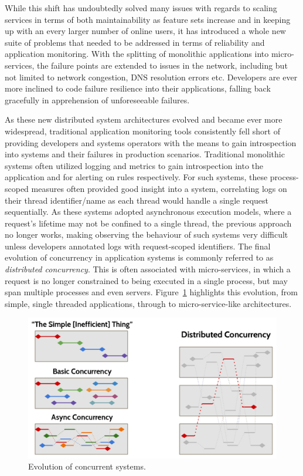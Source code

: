 \documentclass[12pt,pdftex,titlepage]{report}
\begin{document}
            While this shift has undoubtedly solved many issues with regards to scaling services in terms of both maintainability as feature sets increase and in keeping up
            with an every larger number of online users, it has introduced a whole new suite of problems that needed to be addressed in terms of reliability and application 
            monitoring. With the splitting of monolithic applications into micro-services, the failure points are extended to issues in the network, including but not limited
            to network congestion, DNS resolution errors etc. Developers are ever more inclined to code failure resilience into their applications, falling back gracefully in 
            apprehension of unforeseeable failures.

            As these new distributed system architectures evolved and became ever more widespread, traditional application monitoring tools consistently fell short of providing
            developers and systems operators with the means to gain introspection into systems and their failures in production scenarios. Traditional monolithic systems often
            utilized logging and metrics to gain introspection into the application and for alerting on rules respectively. For such systems, these process-scoped measures often 
            provided good insight into a system, correlating logs on their thread identifier/name as each thread would handle a single request sequentially. As these systems 
            adopted asynchronous execution models, where a request's lifetime may not be confined to a single thread, the previous approach no longer works, making observing
            the behaviour of such systems very difficult unless developers annotated logs with request-scoped identifiers. The final evolution of concurrency in application systems is
            commonly referred to as \textit{distributed concurrency}. This is often associated with micro-services, in which a request is no longer constrained to being executed
            in a single process, but may span multiple processes and even servers. Figure~\ref{fig:concurrency} highlights this evolution, from simple, single threaded applications,
            through to micro-service-like architectures.

            \begin{figure}[htb!]
                \centering
                \includegraphics{concurrency.png}
                \caption{Evolution of concurrent systems.}
                \label{fig:concurrency}
            \end{figure}
\end{document}
